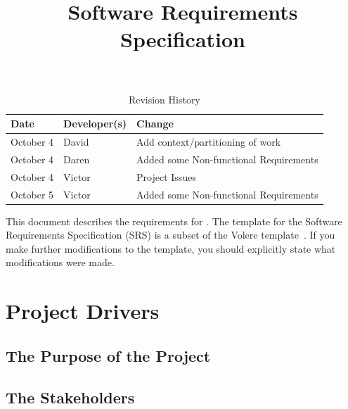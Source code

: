 \documentclass[12pt]{article}
\title{Software Requirements Specification\\\progname}
\author{\authname}
\date{}
\begin{document}
\maketitle

\newpage
{}

\tableofcontents

\newpage

\begin{table}[hp]
\caption{Revision History} \label{TblRevisionHistory}
\begin{tabularx}{\textwidth}{llX}
\toprule
\textbf{Date} & \textbf{Developer(s)} & \textbf{Change}\\
\midrule
October 4 & David & Add context/partitioning of work\\
\midrule
October 4 & Daren & Added some Non-functional Requirements\\
\midrule
October 4 & Victor & Project Issues\\
\midrule
October 5 & Victor & Added some Non-functional Requirements\\
\bottomrule
\end{tabularx}
\end{table}

\newpage

\listoftables
\listoffigures

\newpage


This document describes the requirements for \progname. The template for the Software
Requirements Specification (SRS) is a subset of the Volere
template~\cite{RobertsonAndRobertson2012}. If you make further modifications
to the template, you should explicitly state what modifications were made.

\begin{table}

\end{table}

\section{Project Drivers}

\subsection{The Purpose of the Project}

\subsection{The Stakeholders}
\end{document}
